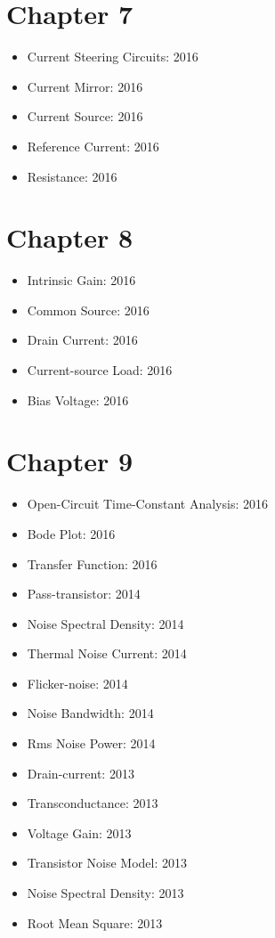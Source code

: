 \documentclass[twocolumn]{article}
\begin{document}
  \section*{Chapter 7}
    \begin{itemize}
      \item Current Steering Circuits: 2016
      \item Current Mirror: 2016
      \item Current Source: 2016
      \item Reference Current: 2016
      \item Resistance: 2016
    \end{itemize}
  \section*{Chapter 8}
    \begin{itemize}
      \item Intrinsic Gain: 2016
      \item Common Source: 2016
      \item Drain Current: 2016
      \item Current-source Load: 2016
      \item Bias Voltage: 2016
    \end{itemize}
  \section*{Chapter 9}
    \begin{itemize}
      \item Open-Circuit Time-Constant Analysis: 2016
      \item Bode Plot: 2016
      \item Transfer Function: 2016

      \item Pass-transistor: 2014
      \item Noise Spectral Density: 2014
      \item Thermal Noise Current: 2014
      \item Flicker-noise: 2014
      \item Noise Bandwidth: 2014
      \item Rms Noise Power: 2014

      \item Drain-current: 2013
      \item Transconductance: 2013
      \item Voltage Gain: 2013
      \item Transistor Noise Model: 2013
      \item Noise Spectral Density: 2013
      \item Root Mean Square: 2013
    \end{itemize}
\end{document}

